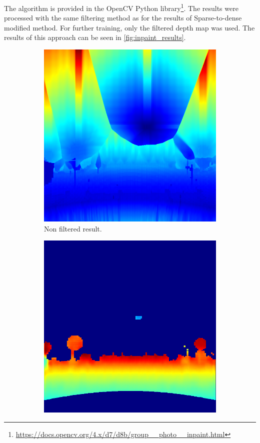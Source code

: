 \documentclass[twoside]{ctuthesis}
\theoremstyle{plain}
\theoremstyle{definition}
\theoremstyle{note}
\begin{document}
The algorithm is provided in the OpenCV Python library\footnote{\url{https://docs.opencv.org/4.x/d7/d8b/group__photo__inpaint.html}}.  The results were processed with the same filtering method as for the results of Sparse-to-dense modified method. For further training, only the filtered depth map was used. The results of this approach can be seen in \autoref{fig:inpaint_results}.
\begin{figure}
	\centering
	\begin{subfigure}[b]{0.3\textwidth}
		\centering
		\includegraphics[width=\textwidth]{raw_inpaint.png}
		\caption{Non filtered result.}
	\end{subfigure}
	\hfill
	\begin{subfigure}[b]{0.3\textwidth}
		\centering
		\includegraphics[width=\textwidth]{inpaint.png}

\end{subfigure}
\end{figure}
\end{document}
